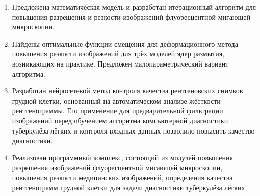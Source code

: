 \begin{enumerate}[beginpenalty=10000]
	\item Предложена математическая модель и разработан итерационный алгоритм для повышения разрешения и резкости изображений флуоресцентной мигающей микроскопии.
	
	\item Найдены оптимальные функции смещения для деформационного метода повышения резкости изображений для трёх моделей ядер размытия, возникающих на практике. Предложен малопараметрический вариант алгоритма.
	
	\item Разработан нейросетевой метод контроля качества рентгеновских снимков грудной клетки, основанный на автоматическом анализе жёсткости рентгенограммы. 
	Его применение для предварительной фильтрации изображений перед обучением алгоритма компьютерной диагностики туберкулёза лёгких и контроля входных данных позволило повысить качество диагностики.
	
	\item Реализован программный комплекс, состоящий из модулей повышения разрешения изображений флуоресцентной мигающей микроскопии, повышения резкости медицинских изображений, определения качества рентгенограмм грудной клетки для задачи диагностики туберкулёза лёгких.
\end{enumerate}

